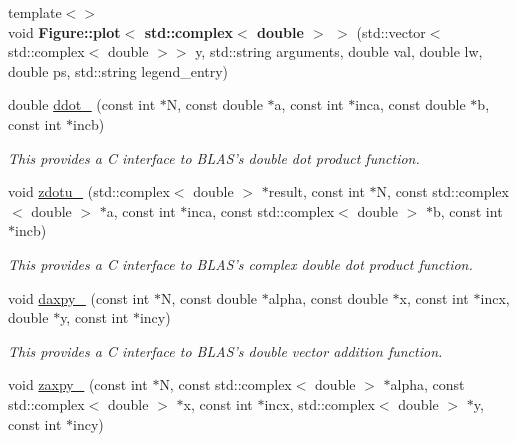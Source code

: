 \begin{DoxyCompactItemize}
\item 
\hypertarget{namespacekeycpp_acfb9f560ec3a131190f23bf18c12b2f8}{{\footnotesize template$<$$>$ }\\void {\bfseries Figure\-::plot$<$ std\-::complex$<$ double $>$ $>$} (std\-::vector$<$ std\-::complex$<$ double $>$$>$ y, std\-::string arguments, double val, double lw, double ps, std\-::string legend\-\_\-entry)}\label{namespacekeycpp_acfb9f560ec3a131190f23bf18c12b2f8}

\item 
\hypertarget{namespacekeycpp_a55e50932cc54f92bdd7e38c6438f4f1f}{double \hyperlink{namespacekeycpp_a55e50932cc54f92bdd7e38c6438f4f1f}{ddot\-\_\-} (const int $\ast$N, const double $\ast$a, const int $\ast$inca, const double $\ast$b, const int $\ast$incb)}\label{namespacekeycpp_a55e50932cc54f92bdd7e38c6438f4f1f}

\begin{DoxyCompactList}\small\item\em This provides a C interface to B\-L\-A\-S's double dot product function. \end{DoxyCompactList}\item 
\hypertarget{namespacekeycpp_a2ce99b4fe4a13b9c70ada81761eb0ca2}{void \hyperlink{namespacekeycpp_a2ce99b4fe4a13b9c70ada81761eb0ca2}{zdotu\-\_\-} (std\-::complex$<$ double $>$ $\ast$result, const int $\ast$N, const std\-::complex$<$ double $>$ $\ast$a, const int $\ast$inca, const std\-::complex$<$ double $>$ $\ast$b, const int $\ast$incb)}\label{namespacekeycpp_a2ce99b4fe4a13b9c70ada81761eb0ca2}

\begin{DoxyCompactList}\small\item\em This provides a C interface to B\-L\-A\-S's complex double dot product function. \end{DoxyCompactList}\item 
\hypertarget{namespacekeycpp_ae99c5b242a21ba683701ccb6ab6534b1}{void \hyperlink{namespacekeycpp_ae99c5b242a21ba683701ccb6ab6534b1}{daxpy\-\_\-} (const int $\ast$N, const double $\ast$alpha, const double $\ast$x, const int $\ast$incx, double $\ast$y, const int $\ast$incy)}\label{namespacekeycpp_ae99c5b242a21ba683701ccb6ab6534b1}

\begin{DoxyCompactList}\small\item\em This provides a C interface to B\-L\-A\-S's double vector addition function. \end{DoxyCompactList}\item 
\hypertarget{namespacekeycpp_a6460fa334239dde761d8f737b9438fed}{void \hyperlink{namespacekeycpp_a6460fa334239dde761d8f737b9438fed}{zaxpy\-\_\-} (const int $\ast$N, const std\-::complex$<$ double $>$ $\ast$alpha, const std\-::complex$<$ double $>$ $\ast$x, const int $\ast$incx, std\-::complex$<$ double $>$ $\ast$y, const int $\ast$incy)}\label{namespacekeycpp_a6460fa334239dde761d8f737b9438fed}


\end{DoxyCompactItemize}
